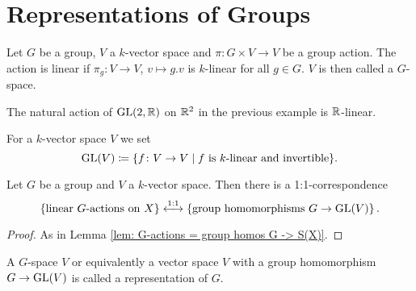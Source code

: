 \section{Representations of Groups}


\begin{defi}
  Let $G$ be a group, $V$ a $k$-vector space and $\pi \colon G \times V \to V$ be a group action.
  The action is linear if $\pi_g \colon V \to V$, $v \mapsto g.v$ is $k$-linear for all $g \in G$.
  $V$ is then called a $G$-space.
\end{defi}


\begin{expl}
  The natural action of $\operatorname{GL}(2,\mathbb{R})$ on $\mathbb{R}^2$ in the previous example is $\mathbb{R}$-linear.
\end{expl}


For a $k$-vector space $V$ we set
\[
            \operatorname{GL}(V)
  \coloneqq \{
              f \colon V \to V
            \mid
              f \text{ is $k$-linear and invertible}
            \}.
\]


\begin{lem}
  Let $G$ be a group and $V$ a $k$-vector space.
  Then there is a 1:1-correspondence
  \[
    \left\{
      \text{linear $G$-actions on $X$}
    \right\}
    \overset{1:1}{\longleftrightarrow}
    \left\{
      \text{group homomorphisms $G \to \operatorname{GL}(V)$}
    \right\}.
  \]
\end{lem}
\begin{proof}
  As in Lemma \ref{lem: G-actions = group homos G -> S(X)}.
\end{proof}


\begin{rem}
  A $G$-space $V$ or equivalently a vector space $V$ with a group homomorphism $G \to \operatorname{GL}(V)$ is called a representation of $G$.
\end{rem}


